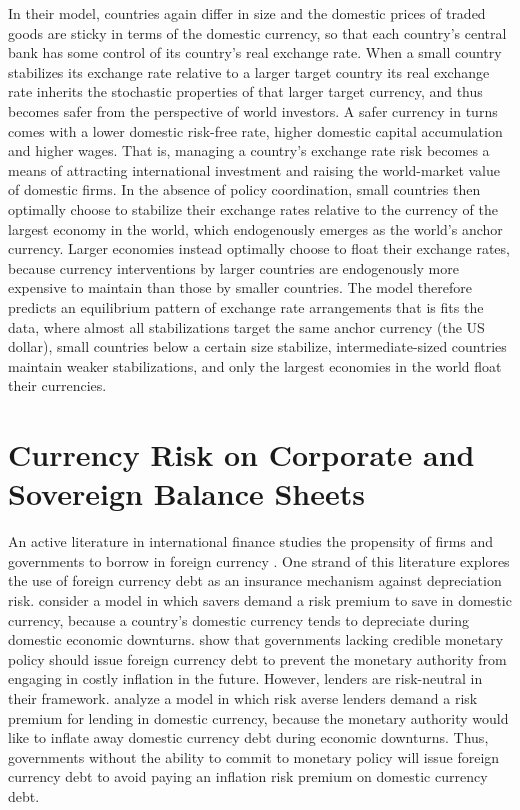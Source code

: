 \documentclass{ar-1col}
\begin{document}
In their model, countries again differ in size and the domestic prices of traded goods are sticky in terms of the domestic currency, so that each country's central bank has some control of its country's real exchange rate. When a small country stabilizes its exchange rate relative to a larger target country its real exchange rate inherits the stochastic properties of that larger target currency, and thus becomes safer from the perspective of world investors. A safer currency in turns comes with a lower domestic risk-free rate, higher domestic capital accumulation and higher wages. That is, managing a country's exchange rate risk becomes a means of attracting international investment and raising the world-market value of domestic firms. In the absence of policy coordination, small countries then optimally choose to stabilize their exchange rates relative to the currency of the largest economy in the world, which endogenously emerges as the world's anchor currency. Larger economies instead optimally choose to float their exchange rates, because currency interventions by larger countries are endogenously more expensive to maintain than those by smaller countries. The model therefore predicts an equilibrium pattern of exchange rate arrangements that is fits the data, where almost all stabilizations target the same anchor currency (the US dollar), small countries below a certain size stabilize, intermediate-sized countries maintain weaker stabilizations, and only the largest economies in the world float their currencies. 

\section{Currency Risk on Corporate and Sovereign Balance Sheets \label{sec_balancesheets}}

An active literature in international finance studies the propensity of firms and governments to borrow in foreign currency \citep{EichengreenHausmann1999}. One strand of this literature explores the use of foreign currency debt as an insurance mechanism against depreciation risk. \citet{Bocola2019} consider a model in which savers demand a risk premium to save in domestic currency, because a country's domestic currency tends to depreciate during domestic economic downturns. \citet{OttonelloPerez2019} show that governments lacking credible monetary policy should issue foreign currency debt to prevent the monetary authority from engaging in costly inflation in the future. However, lenders are risk-neutral in their framework. \citet{du2020sovereign} analyze a model in which risk averse lenders demand a risk premium for lending in domestic currency, because the monetary authority would like to inflate away domestic currency debt during economic downturns. Thus, governments without the ability to commit to monetary policy will issue foreign currency debt to avoid paying an inflation risk premium on domestic currency debt. 
\end{document}

